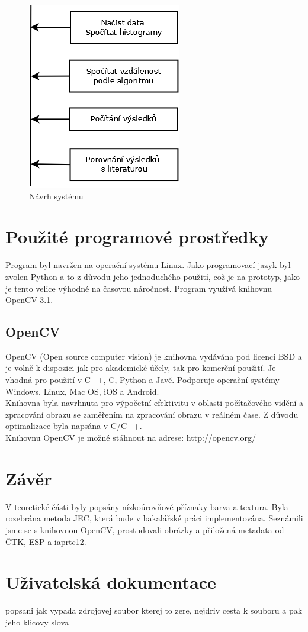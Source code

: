 \documentclass[czech,BP]{thesiskiv}
\begin{document}
\begin{figure}[h]
		\centering
		\includegraphics[width=253px]{./img/graf.png}	
		\caption{Návrh systému}
\end{figure}


\chapter{Použité programové prostředky}
Program byl navržen na operační systému Linux. Jako programovací jazyk byl zvolen Python a to z důvodu jeho jednoduchého použití, což je na prototyp, jako je tento velice výhodné na časovou náročnost. Program využívá knihovnu OpenCV 3.1. 
  
\section{OpenCV}
OpenCV (Open source computer vision) je knihovna vydávána pod licencí BSD a je volně k dispozici jak pro akademické účely, tak pro komerční použití. Je vhodná pro použití v C++, C, Python a Javě. Podporuje operační systémy Windows, Linux, Mac OS, iOS a Android.
\\
Knihovna byla navrhnuta pro výpočetní efektivitu v oblasti počítačového vidění a zpracování obrazu se zaměřením na zpracování obrazu v reálném čase. Z důvodu optimalizace byla napsána v C/C++. 
\\
Knihovnu OpenCV je možné stáhnout na adrese: http://opencv.org/


\chapter{Závěr}
V teoretické části byly popsány nízkoúrovňové příznaky barva a textura. Byla rozebrána metoda JEC, která bude v bakalářské práci implementována. Seznámili jsme se s knihovnou OpenCV, prostudovali obrázky a přiložená metadata od ČTK, ESP a iaprtc12. 

\chapter{Uživatelská dokumentace}
popsani jak vypada zdrojovej soubor kterej to zere, nejdriv cesta k souboru a pak jeho klicovy slova
 
% 
%

{\raggedright\small

}
\end{document}
